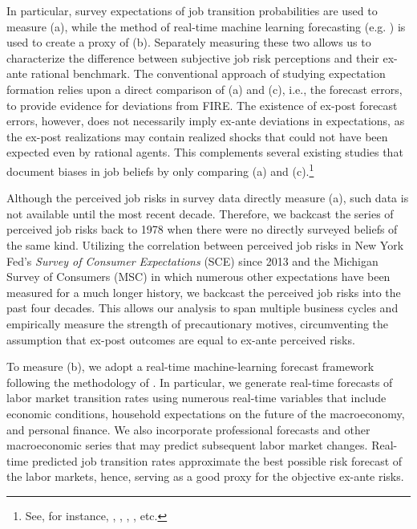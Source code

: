  
In particular, survey expectations of job transition probabilities are used to measure (a), while the method of real-time machine learning forecasting (e.g. \cite{bianchi2022belief}) is used to create a proxy of (b). Separately measuring these two allows us to characterize the difference between subjective job risk perceptions and their ex-ante rational benchmark. The conventional approach of studying expectation formation relies upon a direct comparison of (a) and (c), i.e., the forecast errors, to provide evidence for deviations from FIRE. The existence of ex-post forecast errors, however, does not necessarily imply ex-ante deviations in expectations, as the ex-post realizations may contain realized shocks that could not have been expected even by rational agents. This complements several existing studies that document biases in job beliefs by only comparing (a) and (c).\footnote{See, for instance, \cite{stephens2004job}, \cite{spinnewijn2015unemployed}, \cite{mueller2021job}, \cite{balleer2021effects}, etc. }


Although the perceived job risks in survey data directly measure (a), such data is not available until the most recent decade. Therefore, we backcast the series of perceived job risks back to 1978 when there were no directly surveyed beliefs of the same kind. Utilizing the correlation between perceived job risks in New York Fed's \emph{Survey of Consumer Expectations} (SCE) since 2013 and the Michigan Survey of Consumers (MSC) in which numerous other expectations have been measured for a much longer history, we backcast the perceived job risks into the past four decades. This allows our analysis to span multiple business cycles and empirically measure the strength of precautionary motives, circumventing the assumption that ex-post outcomes are equal to ex-ante perceived risks. 

To measure (b), we adopt a real-time machine-learning forecast framework following the methodology of \cite{bianchi2022belief}. In particular, we generate real-time forecasts of labor market transition rates using numerous real-time variables that include economic conditions, household expectations on the future of the macroeconomy, and personal finance. We also incorporate professional forecasts and other macroeconomic series that may predict subsequent labor market changes. Real-time predicted job transition rates approximate the best possible risk forecast of the labor markets, hence, serving as a good proxy for the objective ex-ante risks.  

